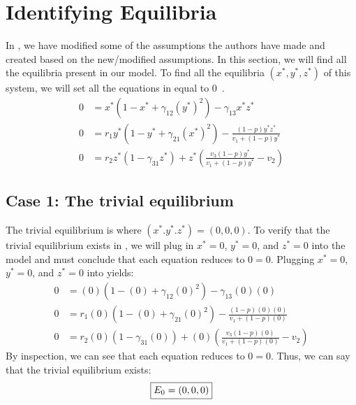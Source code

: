 \chapter{Identifying Equilibria}\label{chapter:identify_equilibria}
In , we have modified some of the assumptions the authors have made and created  based on the new/modified assumptions. In this section, we will find all the equilibria present in our model. To find all the equilibria $\left(x^*,y^*,z^*\right)$ of this system, we will set all the equations in  equal to 0~\cite{book:2478639}.
\begin{subequations}
    \begin{align}
        0 &= x^*\left(1-x^*+\gamma_{12}\left(y^*\right)^2\right)-\gamma_{13}x^*z^*
        \label{eq:4.1a}\\
        0 &= r_1y^*\left(1-y^*+\gamma_{21}\left(x^*\right)^2\right)-\frac{\left(1-p\right)y^*z^*}{v_1+\left(1-p\right)y^*}
        \label{eq:4.1b}\\
        0 &= r_2z^*\left(1-\gamma_{31}z^*\right)+z^*\left(\frac{v_3\left(1-p\right)y^*}{v_1+\left(1-p\right)y^*}-v_2\right)
        \label{eq:4.1c}
    \end{align}
    \label{eq:4.1}
\end{subequations}

\section{Case 1: The trivial equilibrium}\label{sec:trivial_equilibrium}
The trivial equilibrium is where $\left(x^*.y^*.z^*\right)=(0,0,0)$. To verify that the trivial equilibrium exists in , we will plug in $x^*=0$, $y^*=0$, and $z^*=0$ into the model and must conclude that each equation reduces to $0=0$. Plugging $x^*=0$, $y^*=0$, and $z^*=0$ into  yields:
\begin{align*}
    0 &= (0)\left(1-(0)+\gamma_{12}(0)^2\right)-\gamma_{13}(0)(0)\\
    0 &= r_1(0)\left(1-(0)+\gamma_{21}(0)^2\right)-\frac{\left(1-p\right)(0)(0)}{v_1+\left(1-p\right)(0)}\\
    0 &= r_2(0)\left(1-\gamma_{31}(0)\right)+(0)\left(\frac{v_3\left(1-p\right)(0)}{v_1+\left(1-p\right)(0)}-v_2\right)
\end{align*}
By inspection, we can see that each equation reduces to $0=0$. Thus, we can say that the trivial equilibrium exists:
\[
\fbox{$\displaystyle E_0=\left(0,0,0\right)$}
\]

